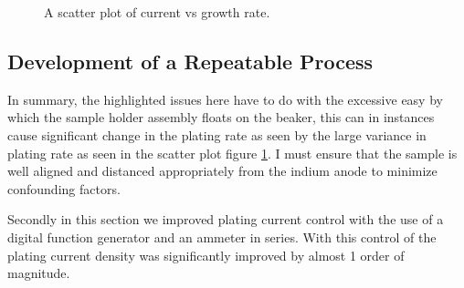 \begin{figure}
    \centering
    \caption{A scatter plot of current vs growth rate.}
    \label{fig:scatterplot}
\end{figure}



\subsection{Development of a Repeatable Process}
In summary, the highlighted issues here have to do with the excessive easy by which the sample holder assembly floats on the beaker, this can in instances cause significant change in the plating rate as seen by the large variance in plating rate as seen in the scatter plot figure \ref{fig:scatterplot}. I must ensure that the sample is well aligned and distanced appropriately from the indium anode to minimize confounding factors.

Secondly in this section we improved plating current control with the use of a digital function generator and an ammeter in series. With this control of the plating current density was significantly improved by almost 1 order of magnitude.

